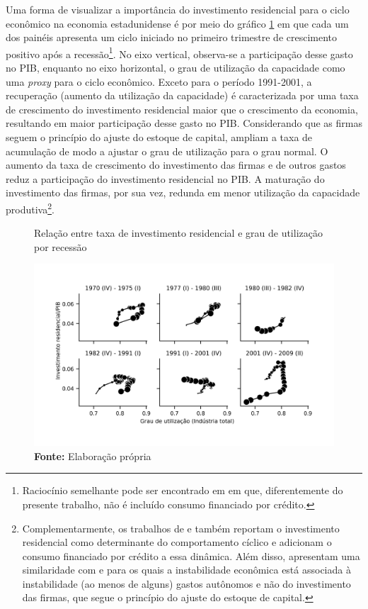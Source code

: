 Uma forma de visualizar a importância do investimento residencial para o ciclo econômico na economia estadunidense é por meio do gráfico \ref{Investo_Resid} em que cada um dos painéis apresenta um ciclo iniciado no primeiro trimestre de crescimento positivo após a recessão\footnote{
	Raciocínio semelhante pode ser encontrado em \textcite{fiebiger_semi-autonomous_2018} em que, diferentemente do presente trabalho, não é incluído consumo financiado por crédito.}. 
No eixo vertical, observa-se a participação desse gasto no PIB, enquanto no eixo horizontal, o grau de utilização da capacidade como uma \textit{proxy} para o ciclo econômico. Exceto para o período 1991-2001, a recuperação (aumento da utilização da capacidade) é caracterizada por uma taxa de crescimento do investimento residencial maior que o crescimento da economia, resultando em maior participação desse gasto no PIB. Considerando que as firmas seguem o princípio do ajuste do estoque de capital, ampliam a taxa de acumulação de modo a ajustar o grau de utilização para o grau normal. O aumento da taxa de crescimento do investimento das firmas e de outros gastos reduz a participação do investimento residencial no PIB. A maturação do investimento das firmas, por sua vez, redunda em menor utilização da capacidade produtiva\footnote{
	Complementarmente, os trabalhos de \textcite{fiebiger_semi-autonomous_2018} e \textcite{fiebiger_trend_2017} também reportam o investimento residencial como determinante do comportamento cíclico e adicionam o consumo financiado por crédito a essa dinâmica. Além disso, apresentam uma similaridade com \textcite{dejuan_hidden_2017} e \textcite{teixeira_crescimento_2015} para os quais a instabilidade econômica está associada à instabilidade (ao menos de alguns) gastos autônomos e não do investimento das firmas, que segue o princípio do ajuste do estoque de capital.}. 


\begin{figure}[H]
	\centering
	\caption{Relação entre taxa de investimento residencial e grau de utilização por recessão}
	\label{Investo_Resid}
	\includegraphics[width=\textwidth]{Fatos_Estilizados/Figs/Empiria.png}
	\caption*{\textbf{Fonte:} Elaboração própria}
\end{figure}

